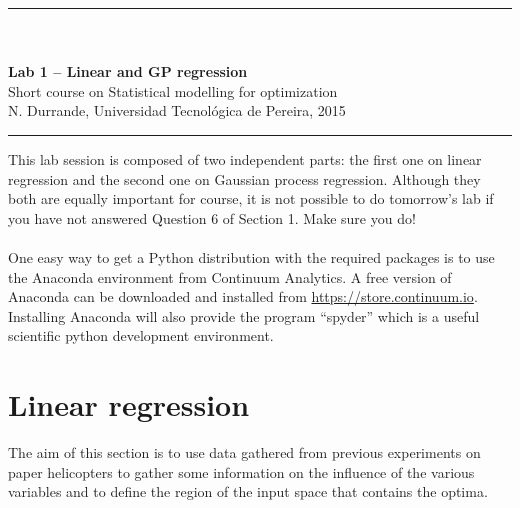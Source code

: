 \documentclass[12pt]{scrartcl}
\begin{document}
\begin{center}
	\rule{\textwidth}{1pt}
	\\ \ \\
	{\LARGE \textbf{Lab 1 -- Linear and GP regression}}\\ 
	\vspace{3mm}
	{\large Short course on Statistical modelling for optimization\\ \vspace{3mm}}
	{\normalsize N. Durrande, Universidad Tecnol\'ogica de Pereira, 2015}\\ 
	\vspace{3mm}
	\rule{\textwidth}{1pt}
	\vspace{5mm}
\end{center}
This lab session is composed of two independent parts: the first one on linear regression and the second one on Gaussian process regression. Although they both are equally important for course, it is not possible to do tomorrow's lab if you have not answered Question 6 of Section 1. Make sure you do!

\paragraph{}
\noindent One easy way to get a Python distribution with the required packages is to use the Anaconda environment from Continuum Analytics.
A free version of Anaconda can be downloaded and installed from  \url{https://store.continuum.io}. Installing Anaconda will also provide the program ``spyder'' which is a useful scientific python development environment.

\section{Linear regression}
The aim of this section is to use data gathered from previous experiments on paper helicopters to gather some information on the influence of the various variables and to define the region of the input space that contains the optima.

\end{document}
